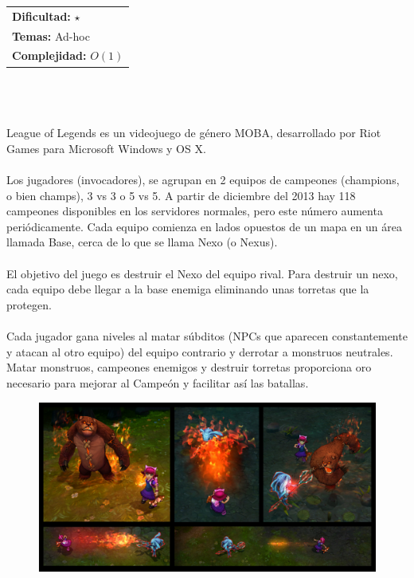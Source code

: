 \documentclass[12pt]{article}
\begin{document}
\hfill
\begin{tabular}{@{}l@{}}
\textbf{Dificultad:} $\star$ \\
\textbf{Temas:} Ad-hoc \\
\textbf{Complejidad:} $O(1)$
\end{tabular}\\
\\
\\League of Legends es un videojuego de género MOBA, desarrollado por Riot Games para Microsoft Windows y OS X.\\
\\Los jugadores (invocadores), se agrupan en 2 equipos de campeones (champions, o bien champs), 3 vs 3 o 5 vs 5. A partir de diciembre del 2013 hay 118 campeones disponibles en los servidores normales, pero este número aumenta periódicamente. Cada equipo comienza en lados opuestos de un mapa en un área llamada Base, cerca de lo que se llama Nexo (o Nexus).\\ \\El objetivo del juego es destruir el Nexo del equipo rival. Para destruir un nexo, cada equipo debe llegar a la base enemiga eliminando unas torretas que la protegen.\\
\\Cada jugador gana niveles al matar súbditos (NPCs que aparecen constantemente y atacan al otro equipo) del equipo contrario y derrotar a monstruos neutrales. Matar monstruos, campeones enemigos y destruir torretas proporciona oro necesario para mejorar al Campeón y facilitar así las batallas.\\
\begin{figure}[h!] 
\begin{center} 
\includegraphics[scale = 0.90]{annie.PNG}\hspace{50mm}  
\end{center} 
\end{figure}\\ \\ \\ \\ \\ \\ \\ \\
\end{document}

